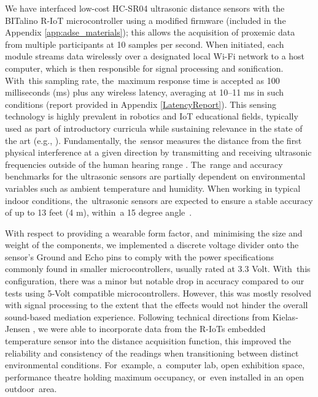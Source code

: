 We have interfaced low-cost HC-SR04 ultrasonic distance sensors with the BITalino R-IoT microcontroller using a modified firmware (included in the Appendix \ref{app:adse_materials}); this allows the acquisition of proxemic data from multiple participants at 10 samples per second. When initiated, each module streams data wirelessly over a designated local Wi-Fi network to a host computer, which is then responsible for signal processing and sonification. With~this sampling rate, the~maximum response time is accepted as 100 milliseconds (ms) plus any wireless latency, averaging at 10--11 ms in such conditions (report provided in Appendix \ref{LatencyReport}). This sensing technology is highly prevalent in robotics and IoT educational fields, typically used as part of introductory curricula \citep{hernandez-barrera_teaching_2014,garcia-ruiz_integrating_2018} while sustaining relevance in the state of the art (e.g., \cite{eguchi_proto-chair_2020,xu_analyzing_2018}). Fundamentally, the~sensor measures the distance from the first physical interference at a given direction by transmitting and receiving ultrasonic frequencies outside of the human hearing range \citep{pal_distance_2015}. The~range and accuracy benchmarks for the ultrasonic sensors are partially dependent on environmental variables such as ambient temperature and humidity. When working in typical indoor conditions, the~ultrasonic sensors are expected to ensure a stable accuracy of up to 13 feet (4 m), within~a 15 degree angle~\cite{abreu_low-cost_2021}.

With respect to providing a wearable form factor, and~minimising the size and weight of the components, we implemented a discrete voltage divider onto the sensor’s Ground and Echo pins to comply with the power specifications commonly found in smaller microcontrollers, usually rated at 3.3 Volt. With~this configuration, there was a minor but notable drop in accuracy compared to our tests using 5-Volt compatible microcontrollers. However, this was mostly resolved with signal processing to the extent that the effects would not hinder the overall sound-based mediation experience. Following technical directions from Kielas-Jensen \citep{magicbycalvin_improve_nodate}, we were able to incorporate data from the R-IoTs embedded temperature sensor into the distance acquisition function, this improved the reliability and consistency of the readings when transitioning between distinct environmental conditions. For~example, a~computer lab, open exhibition space, performance theatre holding maximum occupancy, or~even installed in an open outdoor~area.

